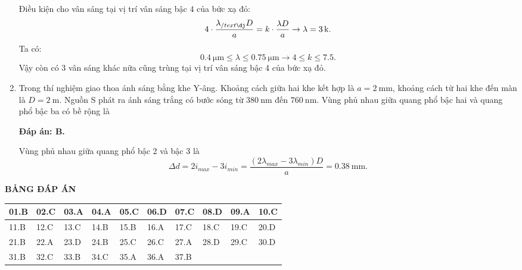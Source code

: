 \begin{enumerate}[label=\bfseries Câu \arabic*:]
{Điều kiện cho vân sáng tại vị trí vân sáng bậc $ 4 $ của bức xạ đỏ:
$$
	4 \cdot \dfrac{\lambda_{/text{đ}} D}{a} = k \cdot \dfrac{\lambda D}{a} \rightarrow \lambda = \xsi{3}{k}.
$$
Ta có:
$$
	\SI{0.4}{\micro \meter} \leq \lambda \leq \SI{0.75}{\micro \meter} \rightarrow \num{4} \leq k \leq \num{7,5}.
$$
Vậy còn có $ 3 $ vân sáng khác nữa cũng trùng tại vị trí vân sáng bậc 4 của bức xạ đỏ.
	}
	
	\item {} 
	
	\cauhoi
	{Trong thí nghiệm giao thoa ánh sáng bằng khe Y-âng. Khoảng cách giữa hai khe kết hợp là $a=\SI{2}{\milli \meter}$, khoảng cách từ hai khe đến màn là $D=\SI{2}{\meter}$. Nguồn S phát ra ánh sáng trắng có bước sóng từ $\SI{380}{\nano \meter}$ đến $\SI{760}{\nano \meter}$. Vùng phủ nhau giữa quang phổ bậc hai và quang phổ bậc ba có bề rộng là
	}
	
	\loigiai
	{		\textbf{Đáp án: B.}
		
Vùng phủ nhau giữa quang phổ bậc 2 và bậc 3 là
$$
	\Delta d = 2i_{max} - 3i_{min} = \dfrac{(2\lambda_{max} - 3\lambda_{min})D}{a} = \SI{0.38}{\milli \meter}.
$$
		
	}
	
\end{enumerate}

\loigiai
{
	\begin{center}
		\textbf{BẢNG ĐÁP ÁN}
	\end{center}
	\begin{center}
		\begin{tabular}{|m{2.8em}|m{2.8em}|m{2.8em}|m{2.8em}|m{2.8em}|m{2.8em}|m{2.8em}|m{2.8em}|m{2.8em}|m{2.8em}|}
			\hline
			01.B  & 02.C  & 03.A  & 04.A  & 05.C  & 06.D  & 07.C & 08.D & 09.A & 10.C \\
			\hline
			11.B  & 12.C  & 13.C  & 14.B  & 15.B  & 16.A  & 17.C & 18.C & 19.C & 20.D \\
			\hline
			21.B  & 22.A  & 23.D  & 24.B  & 25.C  & 26.C  & 27.A & 28.D & 29.C & 30.D \\
			\hline
			31.B  & 32.C  & 33.B  & 34.C  & 35.A  & 36.A  & 37.B & & & \\
			\hline
			
		\end{tabular}
	\end{center}
}

